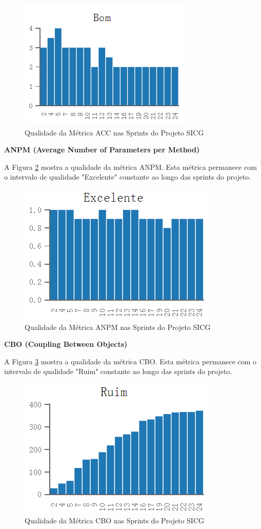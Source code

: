 \begin{figure}[H]
		\centering
			\includegraphics[scale=1.0]{figuras/acc.png}
		\caption{Qualidade da Métrica ACC nas Sprints do Projeto SICG}
		\label{acc}
\end{figure}

\textbf{ANPM (Average Number of Parameters per Method)}

A Figura \ref{anpm} mostra a qualidade da métrica ANPM. Esta métrica permanece com o intervalo de qualidade "Excelente" constante ao longo das sprints do projeto.

\begin{figure}[H]
		\centering
			\includegraphics[scale=1.0]{figuras/anpm.png}
		\caption{Qualidade da Métrica ANPM nas Sprints do Projeto SICG}
		\label{anpm}
\end{figure}

\textbf{CBO (Coupling Between Objects)}

A Figura \ref{cbo} mostra a qualidade da métrica CBO. Esta métrica permanece com o intervalo de qualidade "Ruim" constante ao longo das sprints do projeto.

\begin{figure}[H]
		\centering
			\includegraphics[scale=1.0]{figuras/cbo.png}
		\caption{Qualidade da Métrica CBO nas Sprints do Projeto SICG}
		\label{cbo}
\end{figure}

